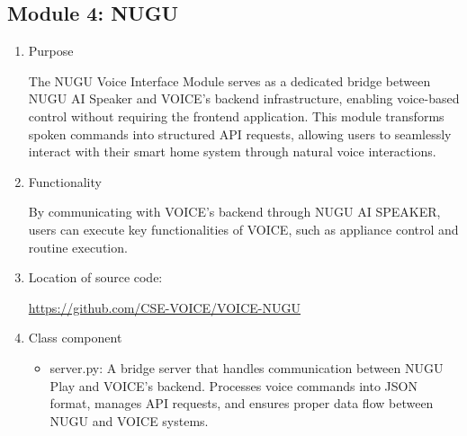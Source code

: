 \documentclass[conference]{IEEEtran}
\begin{document}
\vspace{0.7em} %

\subsection{Module 4: NUGU}
\vspace{0.5em}

\begin{enumerate}[label=\arabic*]
    \item Purpose\par
    \vspace{0.3em}
    The NUGU Voice Interface Module serves as a dedicated bridge between NUGU AI Speaker and VOICE's backend infrastructure, enabling voice-based control without requiring the frontend application. This module transforms spoken commands into structured API requests, allowing users to seamlessly interact with their smart home system through natural voice interactions.

    \vspace{1em}

    \item Functionality\par
    \vspace{0.3em}
    By communicating with VOICE’s backend through NUGU AI SPEAKER, users can execute key functionalities of VOICE, such as appliance control and routine execution.

    \vspace{1em}

    \item Location of source code:\par
    \vspace{0.3em}
    \href{https://github.com/CSE-VOICE/VOICE-NUGU}{https://github.com/CSE-VOICE/VOICE-NUGU}

    \vspace{1em}

    \item Class component\par
    \vspace{0.3em}

    \begin{itemize}[label=-]
        \item server.py: A bridge server that handles communication between NUGU Play and VOICE's backend. Processes voice commands into JSON format, manages API requests, and ensures proper data flow between NUGU and VOICE systems.


\end{itemize}
\end{enumerate}
\end{document}
